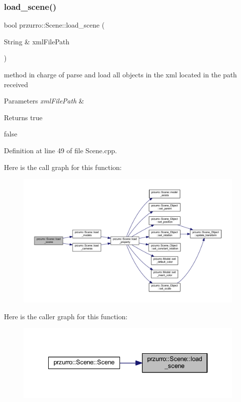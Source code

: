 \subsubsection{\texorpdfstring{load\_scene()}{load\_scene()}}
{\footnotesize\ttfamily bool przurro\+::\+Scene\+::load\+\_\+scene (\begin{DoxyParamCaption}\item[{String \&}]{xml\+File\+Path }\end{DoxyParamCaption})}



method in charge of parse and load all objects in the xml located in the path received 


\begin{DoxyParams}{Parameters}
{\em xml\+File\+Path} & \\
\hline
\end{DoxyParams}
\begin{DoxyReturn}{Returns}
true 

false 
\end{DoxyReturn}


Definition at line 49 of file Scene.\+cpp.

Here is the call graph for this function\+:
\nopagebreak
\begin{figure}[H]
\begin{center}
\leavevmode
\includegraphics[width=350pt]{d8/d56/classprzurro_1_1_scene_a06f84762709af4ba3b920b01f2ae6cdf_cgraph}
\end{center}
\end{figure}
Here is the caller graph for this function\+:
\nopagebreak
\begin{figure}[H]
\begin{center}
\leavevmode
\includegraphics[width=334pt]{d8/d56/classprzurro_1_1_scene_a06f84762709af4ba3b920b01f2ae6cdf_icgraph}
\end{center}
\end{figure}
\mbox{\label{classprzurro_1_1_scene_acd91a4c5188aa41add75a093de32b664}} 
